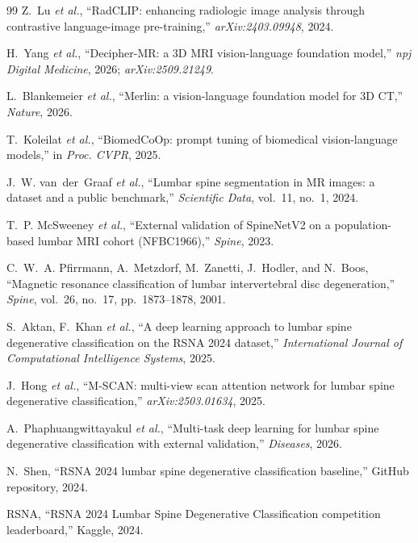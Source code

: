 \documentclass[conference]{IEEEtran}
\begin{document}
\begin{thebibliography}{99}
Z.~Lu \textit{et al.},
``RadCLIP: enhancing radiologic image analysis through contrastive
language-image pre-training,''
\textit{arXiv:2403.09948}, 2024.

H.~Yang \textit{et al.},
``Decipher-MR: a 3D MRI vision-language foundation model,''
\textit{npj Digital Medicine}, 2026;\newline
\textit{arXiv:2509.21249}.

L.~Blankemeier \textit{et al.},
``Merlin: a vision-language foundation model for 3D CT,''
\textit{Nature}, 2026.

T.~Koleilat \textit{et al.},
``BiomedCoOp: prompt tuning of biomedical vision-language models,''
in \textit{Proc. CVPR}, 2025.

J.~W. van~der~Graaf \textit{et al.},
``Lumbar spine segmentation in MR images: a dataset and a public
benchmark,''
\textit{Scientific Data}, vol.~11, no.~1, 2024.

T.~P. McSweeney \textit{et al.},
``External validation of SpineNetV2 on a population-based lumbar MRI
cohort (NFBC1966),''
\textit{Spine}, 2023.

C.~W.~A. Pfirrmann, A.~Metzdorf, M.~Zanetti, J.~Hodler, and
N.~Boos,
``Magnetic resonance classification of lumbar intervertebral disc
degeneration,''
\textit{Spine}, vol.~26, no.~17, pp.~1873--1878, 2001.

S.~Aktan, F.~Khan \textit{et al.},
``A deep learning approach to lumbar spine degenerative classification
on the RSNA 2024 dataset,''
\textit{International Journal of Computational Intelligence Systems},
2025.

J.~Hong \textit{et al.},
``M-SCAN: multi-view scan attention network for lumbar spine
degenerative classification,''
\textit{arXiv:2503.01634}, 2025.

A.~Phaphuangwittayakul \textit{et al.},
``Multi-task deep learning for lumbar spine degenerative
classification with external validation,''
\textit{Diseases}, 2026.

N.~Shen,
``RSNA 2024 lumbar spine degenerative classification baseline,''
GitHub repository, 2024.

RSNA, ``RSNA 2024 Lumbar Spine Degenerative Classification
competition leaderboard,''
Kaggle, 2024.

\end{thebibliography}
\end{document}
